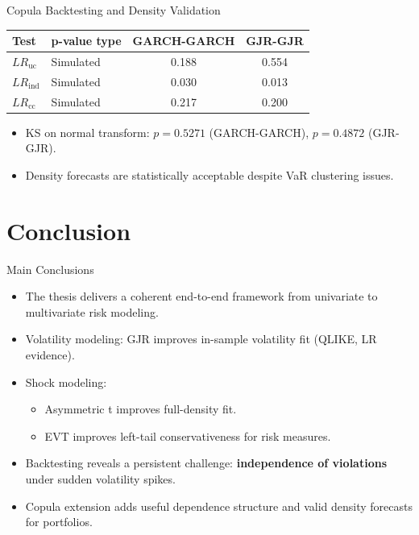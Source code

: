 \documentclass[aspectratio=169,11pt]{beamer}
\begin{document}
\begin{frame}{Copula Backtesting and Density Validation}
\begin{table}
\centering
\begin{tabular}{llcc}
\toprule
Test & p-value type & GARCH-GARCH & GJR-GJR \\
\midrule
\(LR_{\text{uc}}\) & Simulated & 0.188 & 0.554 \\
\(LR_{\text{ind}}\) & Simulated & 0.030 & 0.013 \\
\(LR_{\text{cc}}\) & Simulated & 0.217 & 0.200 \\
\bottomrule
\end{tabular}
\end{table}
\begin{itemize} \setlength{\itemsep}{1em}
\item KS on normal transform: \(p=0.5271\) (GARCH-GARCH), \(p=0.4872\) (GJR-GJR).
\item Density forecasts are statistically acceptable despite VaR clustering issues.
\end{itemize}
\end{frame}

\section{Conclusion}
\begin{frame}{Main Conclusions}
\begin{itemize}\setlength{\itemsep}{1em}
\item The thesis delivers a coherent end-to-end framework from univariate to multivariate risk modeling.
\item Volatility modeling: GJR improves in-sample volatility fit (QLIKE, LR evidence).
\item Shock modeling:
\begin{itemize}
\item Asymmetric t improves full-density fit.
\item EVT improves left-tail conservativeness for risk measures.
\end{itemize}
\item Backtesting reveals a persistent challenge: \textbf{independence of violations} under sudden volatility spikes.
\item Copula extension adds useful dependence structure and valid density forecasts for portfolios.
\end{itemize}
\end{frame}
\end{document}
